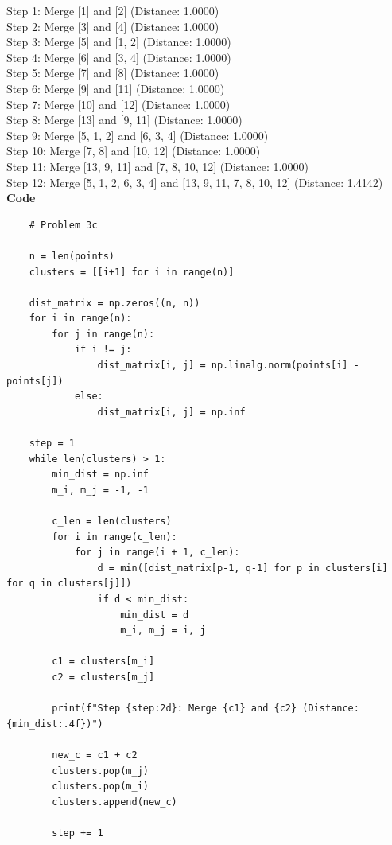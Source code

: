 \documentclass[12pt]{article}
\begin{document}
\begin{enumerate}[label=(\alph*)]
    Step  1: Merge [1] and [2] (Distance: 1.0000) \\
    Step  2: Merge [3] and [4] (Distance: 1.0000) \\
    Step  3: Merge [5] and [1, 2] (Distance: 1.0000) \\
    Step  4: Merge [6] and [3, 4] (Distance: 1.0000) \\
    Step  5: Merge [7] and [8] (Distance: 1.0000) \\
    Step  6: Merge [9] and [11] (Distance: 1.0000) \\
    Step  7: Merge [10] and [12] (Distance: 1.0000) \\
    Step  8: Merge [13] and [9, 11] (Distance: 1.0000) \\
    Step  9: Merge [5, 1, 2] and [6, 3, 4] (Distance: 1.0000) \\
    Step 10: Merge [7, 8] and [10, 12] (Distance: 1.0000) \\
    Step 11: Merge [13, 9, 11] and [7, 8, 10, 12] (Distance: 1.0000) \\
    Step 12: Merge [5, 1, 2, 6, 3, 4] and [13, 9, 11, 7, 8, 10, 12] (Distance: 1.4142) \\

    \textbf{Code}
    
    \begin{lstlisting}
    # Problem 3c

    n = len(points)
    clusters = [[i+1] for i in range(n)]

    dist_matrix = np.zeros((n, n))
    for i in range(n):
        for j in range(n):
            if i != j:
                dist_matrix[i, j] = np.linalg.norm(points[i] - points[j])
            else:
                dist_matrix[i, j] = np.inf

    step = 1
    while len(clusters) > 1:
        min_dist = np.inf
        m_i, m_j = -1, -1
        
        c_len = len(clusters)
        for i in range(c_len):
            for j in range(i + 1, c_len):
                d = min([dist_matrix[p-1, q-1] for p in clusters[i] for q in clusters[j]])
                if d < min_dist:
                    min_dist = d
                    m_i, m_j = i, j
                    
        c1 = clusters[m_i]
        c2 = clusters[m_j]
        
        print(f"Step {step:2d}: Merge {c1} and {c2} (Distance: {min_dist:.4f})")
        
        new_c = c1 + c2
        clusters.pop(m_j)
        clusters.pop(m_i)
        clusters.append(new_c)
        
        step += 1
    \end{lstlisting}


\end{enumerate}
\end{document}
